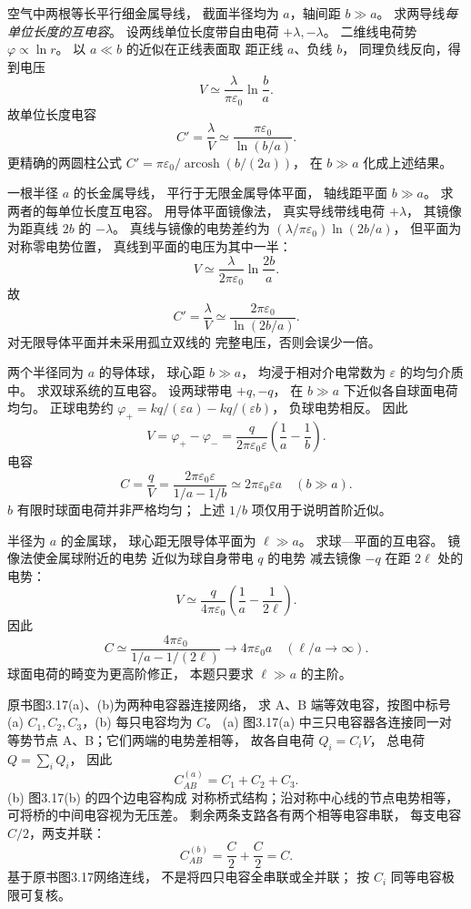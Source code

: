 空气中两根等长平行细金属导线，
截面半径均为 $a$，轴间距 $b\gg a$。
求两导线\emph{每单位长度的互电容}。
\exsolution
设两线单位长度带自由电荷
$+\lambda,-\lambda$。
二维线电荷势
$\varphi\propto\ln r$。
以 $a\ll b$ 的近似在正线表面取
距正线 $a$、负线 $b$，
同理负线反向，得到电压
\[
V\simeq\frac{\lambda}{\pi\varepsilon_0}\ln\frac ba.
\]
故单位长度电容
\[
\boxed{C'=\frac{\lambda}{V}
\simeq\frac{\pi\varepsilon_0}{\ln(b/a)}}.
\]
\excheck 更精确的两圆柱公式
$C'=\pi\varepsilon_0/
\operatorname{arcosh}(b/(2a))$，
在 $b\gg a$ 化成上述结果。

一根半径 $a$ 的长金属导线，
平行于无限金属导体平面，
轴线距平面 $b\gg a$。
求两者的每单位长度互电容。
\exsolution
用导体平面镜像法，
真实导线带线电荷 $+\lambda$，
其镜像为距真线 $2b$ 的 $-\lambda$。
真线与镜像的电势差约为
$(\lambda/\pi\varepsilon_0)\ln(2b/a)$，
但平面为对称零电势位置，
真线到平面的电压为其中一半：
\[
V\simeq\frac{\lambda}{2\pi\varepsilon_0}\ln\frac{2b}{a}.
\]
故
\[
\boxed{C'=\frac{\lambda}{V}
\simeq\frac{2\pi\varepsilon_0}{\ln(2b/a)}}.
\]
\excheck 对无限导体平面并未采用孤立双线的
完整电压，否则会误少一倍。

两个半径同为 $a$ 的导体球，
球心距 $b\gg a$，
均浸于相对介电常数为 $\varepsilon$ 的均匀介质中。
求双球系统的互电容。
\exsolution
设两球带电 $+q,-q$，
在 $b\gg a$ 下近似各自球面电荷均匀。
正球电势约
$\varphi_+=kq/(\varepsilon a)-kq/(\varepsilon b)$，
负球电势相反。
因此
\[
V=\varphi_+-\varphi_-=
\frac{q}{2\pi\varepsilon_0\varepsilon}
\left(\frac1a-\frac1b\right).
\]
电容
\[
C=\frac qV=
\frac{2\pi\varepsilon_0\varepsilon}
{1/a-1/b}
\simeq\boxed{2\pi\varepsilon_0\varepsilon a}
\quad(b\gg a).
\]
\excheck $b$ 有限时球面电荷并非严格均匀；
上述 $1/b$ 项仅用于说明首阶近似。

半径为 $a$ 的金属球，
球心距无限导体平面为 $\ell\gg a$。
求球—平面的互电容。
\exsolution
镜像法使金属球附近的电势
近似为球自身带电 $q$ 的电势
减去镜像 $-q$ 在距 $2\ell$ 处的电势：
\[
V\simeq\frac{q}{4\pi\varepsilon_0}
\left(\frac1a-\frac1{2\ell}\right).
\]
因此
\[
C\simeq\frac{4\pi\varepsilon_0}
{1/a-1/(2\ell)}
\longrightarrow
\boxed{4\pi\varepsilon_0a}\quad(\ell/a\to\infty).
\]
\excheck 球面电荷的畸变为更高阶修正，
本题只要求 $\ell\gg a$ 的主阶。

原书图3.17(a)、(b)为两种电容器连接网络，
求 A、B 端等效电容，按图中标号
(a) $C_1,C_2,C_3$，(b) 每只电容均为 $C$。
\exsolution
(a) 图3.17(a) 中三只电容器各连接同一对
等势节点 A、B；它们两端的电势差相等，
故各自电荷 $Q_i=C_iV$，
总电荷 $Q=\sum_iQ_i$，
因此
\[
\boxed{C_{AB}^{(a)}=C_1+C_2+C_3}.
\]
(b) 图3.17(b) 的四个边电容构成
对称桥式结构；沿对称中心线的节点电势相等，
可将桥的中间电容视为无压差。
剩余两条支路各有两个相等电容串联，
每支电容 $C/2$，两支并联：
\[
\boxed{C_{AB}^{(b)}
=\frac C2+\frac C2=C}.
\]
\excheck 基于原书图3.17网络连线，
不是将四只电容全串联或全并联；
按 $C_i$ 同等电容极限可复核。
